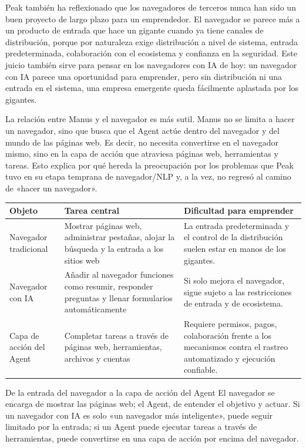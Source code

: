 Peak también ha reflexionado que los navegadores de terceros nunca han sido un buen proyecto de largo plazo para un emprendedor. El navegador se parece más a un producto de entrada que hace un gigante cuando ya tiene canales de distribución, porque por naturaleza exige distribución a nivel de sistema, entrada predeterminada, colaboración con el ecosistema y confianza en la seguridad. Este juicio también sirve para pensar en los navegadores con IA de hoy: un navegador con IA parece una oportunidad para emprender, pero sin distribución ni una entrada en el sistema, una empresa emergente queda fácilmente aplastada por los gigantes.

La relación entre Manus y el navegador es más sutil. Manus no se limita a hacer un navegador, sino que busca que el Agent actúe dentro del navegador y del mundo de las páginas web. Es decir, no necesita convertirse en el navegador mismo, sino en la capa de acción que atraviesa páginas web, herramientas y tareas. Esto explica por qué hereda la preocupación por los problemas que Peak tuvo en su etapa temprana de navegador/NLP y, a la vez, no regresó al camino de «hacer un navegador».

\begin{longtable}{p{}p{}p{}}
\toprule
Objeto & Tarea central & Dificultad para emprender \\
\midrule
Navegador tradicional & Mostrar páginas web, administrar pestañas, alojar la búsqueda y la entrada a los sitios web & La entrada predeterminada y el control de la distribución suelen estar en manos de los gigantes. \\
Navegador con IA & Añadir al navegador funciones como resumir, responder preguntas y llenar formularios automáticamente & Si solo mejora el navegador, sigue sujeto a las restricciones de entrada y de ecosistema. \\
Capa de acción del Agent & Completar tareas a través de páginas web, herramientas, archivos y cuentas & Requiere permisos, pagos, colaboración frente a los mecanismos contra el rastreo automatizado y ejecución confiable. \\
\bottomrule
\end{longtable}

\begin{importantbox}{De la entrada del navegador a la capa de acción del Agent}
El navegador se encarga de mostrar las páginas web; el Agent, de entender el objetivo y actuar. Si un navegador con IA es solo «un navegador más inteligente», puede seguir limitado por la entrada; si un Agent puede ejecutar tareas a través de herramientas, puede convertirse en una capa de acción por encima del navegador.
\end{importantbox}

